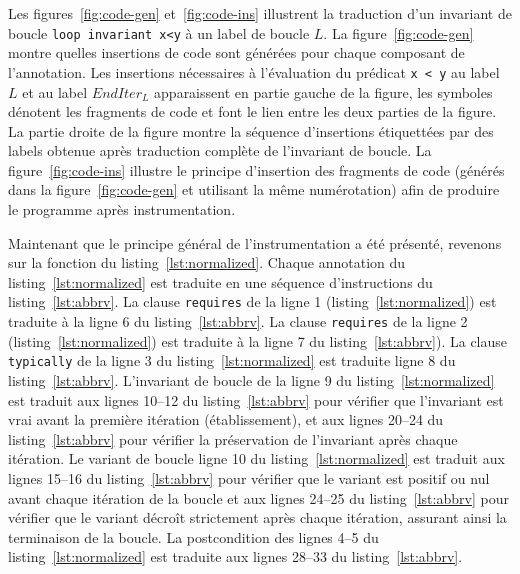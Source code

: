 Les figures~\ref{fig:code-gen} et~\ref{fig:code-ins} illustrent la traduction
d'un invariant de boucle \lstinline'loop invariant x<y' à un label de boucle
$L$.
La figure~\ref{fig:code-gen} montre quelles insertions de code sont générées
pour chaque composant de l'annotation.
Les insertions nécessaires à l'évaluation du prédicat \lstinline'x < y' au
label $L$ et au label $EndIter_L$ apparaissent en partie gauche de la figure,
les symboles  dénotent les
fragments de code et font le lien entre les deux parties de la figure.
La partie droite de la figure montre la séquence d'insertions étiquettées par
des labels obtenue après traduction complète de l'invariant de boucle.
La figure~\ref{fig:code-ins} illustre le principe d'insertion des fragments de
code (générés dans la figure~\ref{fig:code-gen} et utilisant la même
numérotation) afin de produire le programme après instrumentation.


Maintenant que le principe général de l'instrumentation a été présenté, revenons
sur la fonction du listing~\ref{lst:normalized}.
Chaque annotation du listing~\ref{lst:normalized} est traduite en une séquence
d'instructions du listing~\ref{lst:abbrv}.
La clause \lstinline'requires' de la ligne 1 (listing~\ref{lst:normalized}) est
traduite à la ligne 6 du listing~\ref{lst:abbrv}.
La clause \lstinline'requires' de la ligne 2 (listing~\ref{lst:normalized}) est
traduite à la ligne 7 du listing~\ref{lst:abbrv}).
La clause \lstinline'typically' de la ligne 3 du listing~\ref{lst:normalized}
est traduite ligne 8 du listing~\ref{lst:abbrv}.
L'invariant de boucle de la ligne 9 du listing~\ref{lst:normalized} est traduit
aux lignes 10--12 du listing~\ref{lst:abbrv} pour vérifier que l'invariant est
vrai avant la première itération (établissement), et aux lignes 20--24 du
listing~\ref{lst:abbrv} pour vérifier la préservation de l'invariant après
chaque itération.
Le variant de boucle ligne 10 du listing~\ref{lst:normalized} est traduit aux
lignes 15--16 du listing~\ref{lst:abbrv} pour vérifier que le variant est
positif ou nul avant chaque itération de la boucle et aux lignes 24--25 du
listing~\ref{lst:abbrv} pour vérifier que le
variant décroît strictement après chaque itération, assurant ainsi la
terminaison de la boucle.
La postcondition des lignes 4--5 du listing~\ref{lst:normalized} est traduite
aux lignes 28--33 du listing~\ref{lst:abbrv}.

